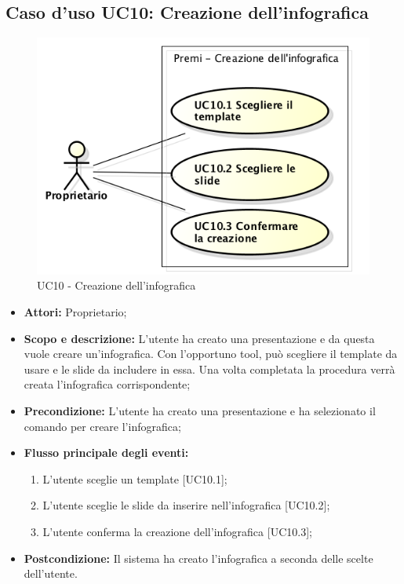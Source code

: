 \subsection{Caso d'uso UC10: Creazione dell'infografica}
\begin{figure}[h] 
	\centering 
	\includegraphics[scale=0.45] {img/UC10.png} 
	\caption{UC10 - Creazione dell'infografica} 
\end{figure}

\begin{itemize}
	\item \textbf{Attori:} Proprietario;
	\item \textbf{Scopo e descrizione:} L'utente ha creato una presentazione e da questa vuole creare un'infografica. Con l'opportuno tool, può scegliere il template da usare e le slide da includere in essa. Una volta completata la procedura verrà creata l'infografica corrispondente;
	\item \textbf{Precondizione:} L'utente ha creato una presentazione e ha selezionato il comando per creare l'infografica;
	
	\item \textbf{Flusso principale degli eventi:}
	\begin{enumerate}
		\item L'utente sceglie un template [UC10.1];
		\item L'utente sceglie le slide da inserire nell'infografica [UC10.2];
		\item L'utente conferma la creazione dell'infografica [UC10.3];
	\end{enumerate}
	\item \textbf{Postcondizione:} Il sistema ha creato l'infografica a seconda delle scelte dell'utente.
\end{itemize}


